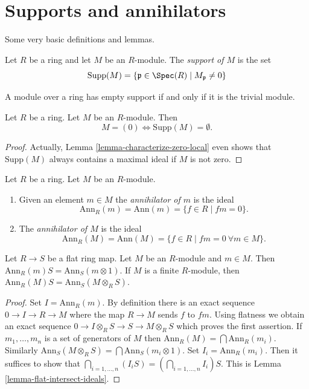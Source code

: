 \section{Supports and annihilators}
\label{section-supp-and-ann}

\noindent
Some very basic definitions and lemmas.

\begin{definition}
\label{definition-support-module}
Let $R$ be a ring and let $M$ be an $R$-module.
The {\it support of $M$} is the set
$$
\text{Supp}(M)
=
\{
\mathfrak p \in \Spec(R)
\mid
M_{\mathfrak p} \not = 0
\}
$$
\end{definition}

\begin{lemma}
\label{lemma-support-zero}
\begin{slogan}
A module over a ring has empty support if and only if it is the trivial module.
\end{slogan}
Let $R$ be a ring. Let $M$ be an $R$-module. Then
$$
M = (0) \Leftrightarrow \text{Supp}(M) = \emptyset.
$$
\end{lemma}

\begin{proof}
Actually,
Lemma \ref{lemma-characterize-zero-local}
even shows that $\text{Supp}(M)$ always contains a maximal ideal
if $M$ is not zero.
\end{proof}

\begin{definition}
\label{definition-annihilator}
Let $R$ be a ring. Let $M$ be an $R$-module.
\begin{enumerate}
\item Given an element $m \in M$ the {\it annihilator of $m$}
is the ideal
$$
\text{Ann}_R(m) = \text{Ann}(m) = \{f \in R \mid fm = 0\}.
$$
\item The {\it annihilator of $M$}
is the ideal
$$
\text{Ann}_R(M) = \text{Ann}(M) = \{f \in R \mid fm = 0\ \forall m \in M\}.
$$
\end{enumerate}
\end{definition}

\begin{lemma}
\label{lemma-annihilator-flat-base-change}
Let $R \to S$ be a flat ring map. Let $M$ be an $R$-module and
$m \in M$. Then $\text{Ann}_R(m) S = \text{Ann}_S(m \otimes 1)$.
If $M$ is a finite $R$-module, then
$\text{Ann}_R(M) S = \text{Ann}_S(M \otimes_R S)$.
\end{lemma}

\begin{proof}
Set $I = \text{Ann}_R(m)$. By definition there is an exact sequence
$0 \to I \to R \to M$ where the map $R \to M$ sends $f$ to $fm$. Using
flatness we obtain an exact sequence
$0 \to I \otimes_R S \to S \to M \otimes_R S$ which proves the first
assertion. If $m_1, \ldots, m_n$ is a set of generators of $M$
then $\text{Ann}_R(M) = \bigcap \text{Ann}_R(m_i)$. Similarly
$\text{Ann}_S(M \otimes_R S) = \bigcap \text{Ann}_S(m_i \otimes 1)$.
Set $I_i = \text{Ann}_R(m_i)$. Then it suffices to show that
$\bigcap_{i = 1, \ldots, n} (I_i S) = (\bigcap_{i = 1, \ldots, n} I_i)S$.
This is Lemma \ref{lemma-flat-intersect-ideals}.
\end{proof}

